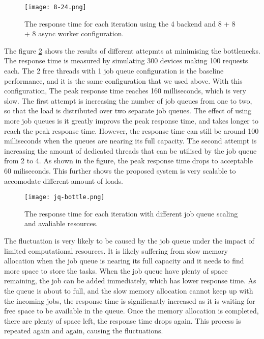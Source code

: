 \documentclass[../thesis.tex]{subfiles}
\begin{document}
\begin{figure}[!ht]
	\centering
	\texttt{[image: 8-24.png]}
	\caption{The response time for each iteration using the 4 backend and 8 + 8 + 8 async worker configuration.}
	\label{fig:8-24}
\end{figure}

The figure \ref{fig:jq-bottle} shows the results of different attepmts at minimising the bottlenecks. The response time is measured by simulating 300 devices making 100 requests each.  The 2 free threads with 1 job queue configuration is the baseline performance, and it is the same configuration that we used above. With this configuration, The peak response time reaches 160 milliseconds, which is very slow. The first attempt is increasing the number of job queues from one to two, so that the load is distributed over two separate job queues. The effect of using more job queues is it greatly improvs the peak response time, and takes longer to reach the peak response time. However, the response time can still be around 100 milliseconds when the queues are nearing its full capacity. The second attempt is increasing the amount of dedicated threads that can be utilised by the job queue from 2 to 4. As shown in the figure, the peak response time drops to acceptable 60 miliseconds. This further shows the proposed system is very scalable to accomodate different amount of loads. 

\begin{figure}[!ht]
	\centering
	\texttt{[image: jq-bottle.png]}
	\caption{The response time for each iteration with different job queue scaling and avaliable resources.}
	\label{fig:jq-bottle}
\end{figure}


The fluctuation is very likely to be caused by the job queue under the impact of limited computational resources. It is likely suffering from slow memory allocation when the job queue is nearing its full capacity and it needs to find more space to store the tasks. When the job queue have plenty of space remaining, the job can be added immediately, which has lower response time. As the queue is about to full, and the slow memory allocation cannot keep up with the incoming jobs, the response time is significantly increased as it is waiting for free space to be available in the queue. Once the memory allocation is completed, there are plenty of space left, the response time drops again. This process is repeated again and again, causing the fluctuations. 
\end{document}
